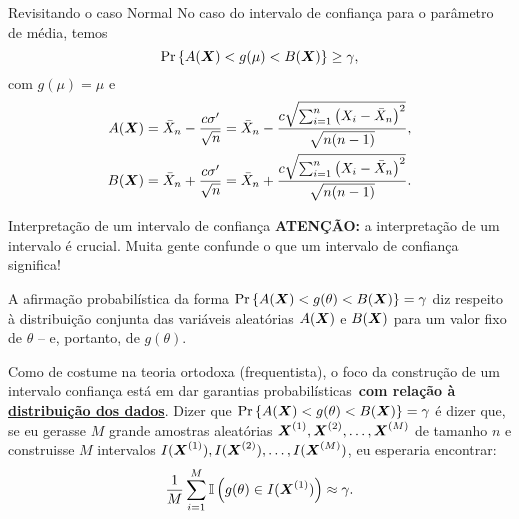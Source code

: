 \begin{frame}{Revisitando o caso Normal}
No caso do intervalo de confiança para o parâmetro de média, temos 
$$\operatorname{Pr}\left\{A(\boldsymbol{X}) < g(\mu) <  B(\boldsymbol{X})\right\} \geq \gamma,$$
com $g(\mu) = \mu$  e 
\begin{align*}
 A(\boldsymbol{X}) &= \bar{X}_n - \frac{c\sigma^\prime}{\sqrt{n}} = \bar{X}_n - \frac{c\sqrt{\sum_{i=1}^n \left(X_i - \bar{X}_n\right)^2}}{\sqrt{n(n-1)}},\\
 B(\boldsymbol{X}) &= \bar{X}_n + \frac{c\sigma^\prime}{\sqrt{n}} = \bar{X}_n + \frac{c\sqrt{\sum_{i=1}^n \left(X_i - \bar{X}_n\right)^2}}{\sqrt{n(n-1)}}.
\end{align*}
\end{frame}

\begin{frame}{Interpretação de um intervalo de confiança}
 \textbf{ATENÇÃO:} a interpretação de um intervalo é crucial.
 Muita gente confunde o que um intervalo de confiança significa!
 \begin{obs}
  A afirmação probabilística da forma $\operatorname{Pr}\left\{A(\boldsymbol{X}) < g(\theta) <  B(\boldsymbol{X})\right\} = \gamma$ diz respeito à distribuição conjunta das variáveis aleatórias  $A(\boldsymbol{X})$ e $B(\boldsymbol{X})$ para um valor fixo de $\theta$ -- e, portanto, de $g(\theta)$.
 \end{obs}
 
 \begin{ideia} 
 Como de costume na teoria ortodoxa (frequentista), o foco da construção de um intervalo confiança está em dar garantias probabilísticas~\textbf{com relação à \underline{distribuição dos dados}}.
 Dizer que $\operatorname{Pr}\left\{A(\boldsymbol{X}) < g(\theta) <  B(\boldsymbol{X})\right\} = \gamma$ é dizer que, se eu gerasse $M$ grande amostras aleatórias $\boldsymbol{X}^{(1)}, \boldsymbol{X}^{(2)}, \ldots, \boldsymbol{X}^{(M)}$ de tamanho $n$ e construisse $M$ intervalos $I(\boldsymbol{X}^{(1)}), I(\boldsymbol{X}^{(2)}), \ldots, I(\boldsymbol{X}^{(M)})$, eu esperaria encontrar:
 \begin{equation*}
  \frac{1}{M}\sum_{i=1}^M \mathbb{I}\left(g(\theta) \in I(\boldsymbol{X}^{(1)}) \right) \approx \gamma.
 \end{equation*}
\end{ideia}

\end{frame}




